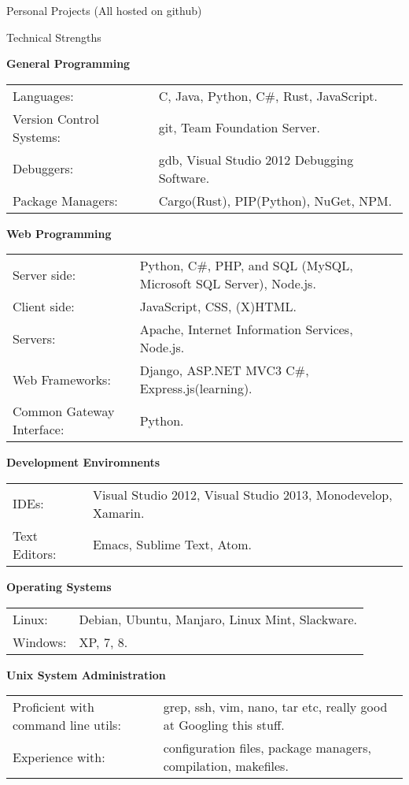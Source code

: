 \documentclass{resume} %
\newcommand{\btab}[2]{
	\bgroup
	\def\arraystretch{#1}
	\begin{tabular}{#2}
}
\newcommand{\etab}{
	\end{tabular} \smallskip
	\egroup
}
\begin{document}
\begin{rSection}{Personal Projects (All hosted on github)}
\end{rSection}


\begin{rSection}{Technical Strengths}

{\bf General Programming}

\btab{1.1}{ l l }
	Languages: & C, Java, Python, C\#, Rust, JavaScript. \\
	Version Control Systems: & git, Team Foundation Server. \\
	Debuggers: & gdb, Visual Studio 2012 Debugging Software. \\
	Package Managers: & Cargo(Rust), PIP(Python), NuGet, NPM. \\
\etab

{\bf Web Programming}

\btab{1.1}{ l l }
	Server side: & Python, C\#, PHP, and SQL (MySQL, Microsoft SQL Server), Node.js. \\
	Client side: & JavaScript, CSS, (X)HTML. \\
	Servers: & Apache, Internet Information Services, Node.js. \\
	Web Frameworks: & Django, ASP.NET MVC3 C\#, Express.js(learning). \\
	Common Gateway Interface: & Python. \\
\etab

{\bf Development Enviromnents}

\btab{1.1}{ l l }
    IDEs: & Visual Studio 2012, Visual Studio 2013, Monodevelop, Xamarin. \\
	Text Editors: & Emacs, Sublime Text, Atom. \\
\etab

{\bf Operating Systems}

\btab{1.1}{ l l }
	Linux: & Debian, Ubuntu, Manjaro, Linux Mint, Slackware. \\
	Windows: & XP, 7, 8. \\
\etab

{\bf Unix System Administration}

\btab{1.1}{ l l }
	Proficient with command line utils: & grep, ssh, vim, nano, tar etc, really good at Googling this stuff. \\
	Experience with: & configuration files, package managers, compilation, makefiles. \\
\etab

\end{rSection}
\end{document}
